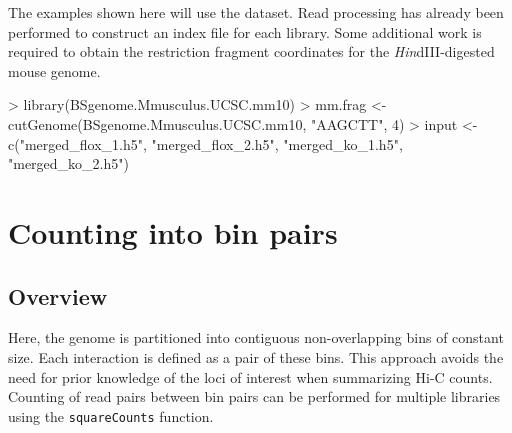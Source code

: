 \documentclass[12pt]{report}
\renewenvironment{Schunk}{\vspace{0pt}}{\vspace{0pt}}
\newcommand{\code}[1]{{\small\texttt{#1}}}
\begin{document}
The examples shown here will use the \citeauthor{sofueva2013cohesin} dataset.
Read processing has already been performed to construct an index file for each library.
Some additional work is required to obtain the restriction fragment coordinates for the \textit{Hin}dIII-digested mouse genome.

\begin{Schunk}
\begin{Sinput}
> library(BSgenome.Mmusculus.UCSC.mm10)
> mm.frag <- cutGenome(BSgenome.Mmusculus.UCSC.mm10, "AAGCTT", 4)
> input <- c("merged_flox_1.h5", "merged_flox_2.h5", "merged_ko_1.h5", "merged_ko_2.h5")
\end{Sinput}
\end{Schunk}

\section{Counting into bin pairs}

\subsection{Overview}
Here, the genome is partitioned into contiguous non-overlapping bins of constant size.
Each interaction is defined as a pair of these bins.
This approach avoids the need for prior knowledge of the loci of interest when summarizing Hi-C counts.
Counting of read pairs between bin pairs can be performed for multiple libraries using the \code{squareCounts} function.
\end{document}
